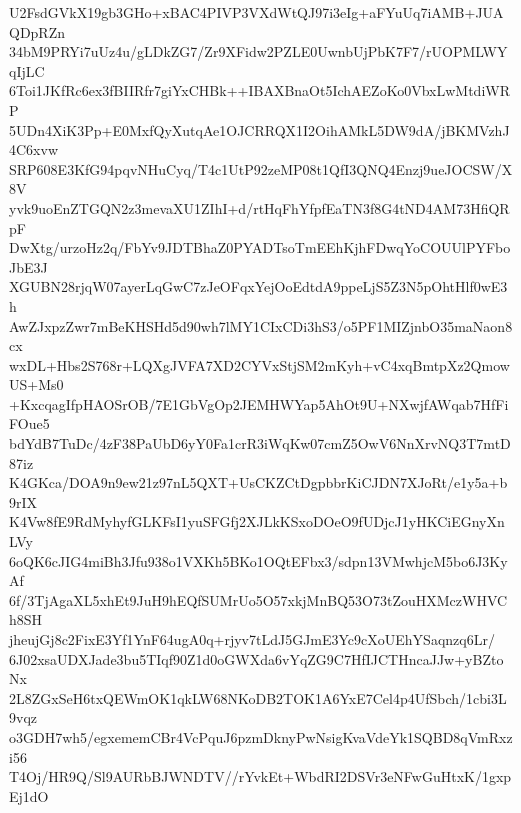 U2FsdGVkX19gb3GHo+xBAC4PIVP3VXdWtQJ97i3eIg+aFYuUq7iAMB+JUAQDpRZn
34bM9PRYi7uUz4u/gLDkZG7/Zr9XFidw2PZLE0UwnbUjPbK7F7/rUOPMLWYqIjLC
6Toi1JKfRc6ex3fBIIRfr7giYxCHBk++IBAXBnaOt5IchAEZoKo0VbxLwMtdiWRP
5UDn4XiK3Pp+E0MxfQyXutqAe1OJCRRQX1I2OihAMkL5DW9dA/jBKMVzhJ4C6xvw
SRP608E3KfG94pqvNHuCyq/T4c1UtP92zeMP08t1QfI3QNQ4Enzj9ueJOCSW/X8V
yvk9uoEnZTGQN2z3mevaXU1ZIhI+d/rtHqFhYfpfEaTN3f8G4tND4AM73HfiQRpF
DwXtg/urzoHz2q/FbYv9JDTBhaZ0PYADTsoTmEEhKjhFDwqYoCOUUlPYFboJbE3J
XGUBN28rjqW07ayerLqGwC7zJeOFqxYejOoEdtdA9ppeLjS5Z3N5pOhtHlf0wE3h
AwZJxpzZwr7mBeKHSHd5d90wh7lMY1CIxCDi3hS3/o5PF1MIZjnbO35maNaon8cx
wxDL+Hbs2S768r+LQXgJVFA7XD2CYVxStjSM2mKyh+vC4xqBmtpXz2QmowUS+Ms0
+KxcqagIfpHAOSrOB/7E1GbVgOp2JEMHWYap5AhOt9U+NXwjfAWqab7HfFiFOue5
bdYdB7TuDc/4zF38PaUbD6yY0Fa1crR3iWqKw07cmZ5OwV6NnXrvNQ3T7mtD87iz
K4GKca/DOA9n9ew21z97nL5QXT+UsCKZCtDgpbbrKiCJDN7XJoRt/e1y5a+b9rIX
K4Vw8fE9RdMyhyfGLKFsI1yuSFGfj2XJLkKSxoDOeO9fUDjcJ1yHKCiEGnyXnLVy
6oQK6cJIG4miBh3Jfu938o1VXKh5BKo1OQtEFbx3/sdpn13VMwhjcM5bo6J3KyAf
6f/3TjAgaXL5xhEt9JuH9hEQfSUMrUo5O57xkjMnBQ53O73tZouHXMczWHVCh8SH
jheujGj8c2FixE3Yf1YnF64ugA0q+rjyv7tLdJ5GJmE3Yc9cXoUEhYSaqnzq6Lr/
6J02xsaUDXJade3bu5TIqf90Z1d0oGWXda6vYqZG9C7HfIJCTHncaJJw+yBZtoNx
2L8ZGxSeH6txQEWmOK1qkLW68NKoDB2TOK1A6YxE7Cel4p4UfSbch/1cbi3L9vqz
o3GDH7wh5/egxememCBr4VcPquJ6pzmDknyPwNsigKvaVdeYk1SQBD8qVmRxzi56
T4Oj/HR9Q/Sl9AURbBJWNDTV//rYvkEt+WbdRI2DSVr3eNFwGuHtxK/1gxpEj1dO
